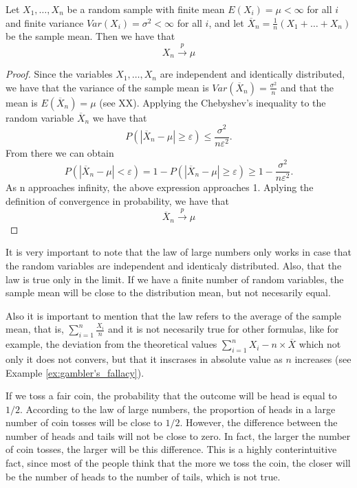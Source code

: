 \begin{theorem}
Let $X_1, \ldots, X_n$ be a random sample with finite mean $E \left( X_i \right) = \mu <\infty$ for all $i$ and finite variance $Var \left( X_i \right) = \sigma^2 <\infty$ for all $i$, and let $\overline {X}_n = \frac {1}{n} \left( X_1 + \ldots + X_n \right)$ be the sample mean. Then we have that
\[
X_n \overset{p}{\rightarrow} \mu
\]
\end{theorem}
\begin{proof}
Since the variables $X_1, \ldots, X_n$ are independent and identically distributed, we have that the variance of the sample mean is $Var \left( \overline {X}_n \right) = \frac{\sigma^2}{n}$ and that the mean is $E \left( \overline {X}_n \right) = \mu$ (see XX). Applying the Chebyshev's inequality to the random variable $\overline {X}_n$ we have that
\[
P \left( \left| \overline {X}_n- \mu \right| \geq \varepsilon \right) \leq \frac{\sigma ^2}{n \varepsilon^2}.
\]
From there we can obtain
\[
P \left( \left| \overline {X}_n - \mu \right| < \varepsilon \right) = 1 - P \left( \left| \overline {X}_n - \mu \right| \geq \varepsilon \right) \geq 1 - \frac{\sigma ^2}{n \varepsilon^2}.
\]
As n approaches infinity, the above expression approaches 1. Aplying the definition of convergence in probability, we have that
\[
\overline{X}_n \overset{p}{\rightarrow} \mu
\]
\end{proof}

It is very important to note that the law of large numbers only works in case that the random variables are independent and identicaly distributed. Also, that the law is true only in the limit. If we have a finite number of random variables, the sample mean will be close to the distribution mean, but not necesarily equal.

Also it is important to mention that the law refers to the average of the sample mean, that is, $\sum_{i=1}^{n} \frac {X_{i}}{n}$ and it is not necesarily true for other formulas, like for example, the deviation from the theoretical values $\sum_{i=1}^{n} X_{i} - n \times \overline {X}$ which not only it does not convers, but that it inscrases in absolute value as $n$ increases (see Example \ref{ex:gambler's_fallacy}).

\begin{example}
\label{ex:gambler's_fallacy}
If we toss a fair coin, the probability that the outcome will be head is equal to $1/2$. According to the law of large numbers, the proportion of heads in a large number of coin tosses will be close to $1/2$. However, the difference between the number of heads and tails will not be close to zero. In fact, the larger the number of coin tosses, the larger will be this difference. This is a highly conterintuitive fact, since most of the people think that the more we toss the coin, the closer will be the number of heads to the number of tails, which is not true.
\end{example}

